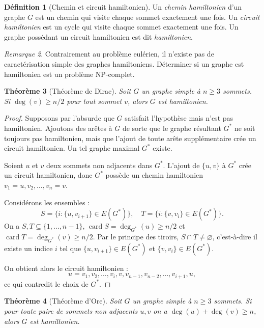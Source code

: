 \documentclass[12pt,a4paper,openany]{book}
\theoremstyle{definition}
\newtheorem{definition}{Définition}[chapter]
\theoremstyle{plain}
\newtheorem{theoreme}[definition]{Théorème}
\theoremstyle{remark}
\newtheorem{remarque}[definition]{Remarque}
\DeclareMathOperator{\card}{card}
\begin{document}
\begin{definition}[Chemin et circuit hamiltonien]
\label{def:hamilton}
Un \emph{chemin hamiltonien} d'un graphe $G$ est un chemin qui visite
chaque sommet exactement une fois. Un \emph{circuit hamiltonien} est un
cycle qui visite chaque sommet exactement une fois. Un graphe possédant
un circuit hamiltonien est dit \emph{hamiltonien}.
\end{definition}

\begin{remarque}
Contrairement au problème eulérien, il n'existe pas de caractérisation
simple des graphes hamiltoniens. Déterminer si un graphe est hamiltonien
est un problème NP-complet.
\end{remarque}

\begin{theoreme}[Théorème de Dirac]
\label{thm:dirac}
Soit $G$ un graphe simple à $n \geq 3$ sommets. Si $\deg(v) \geq n/2$
pour tout sommet $v$, alors $G$ est hamiltonien.
\end{theoreme}

\begin{proof}
Supposons par l'absurde que $G$ satisfait l'hypothèse mais n'est pas
hamiltonien. Ajoutons des arêtes à $G$ de sorte que le graphe résultant
$G^*$ ne soit toujours pas hamiltonien, mais que l'ajout de toute arête
supplémentaire crée un circuit hamiltonien. Un tel graphe maximal $G^*$
existe.

Soient $u$ et $v$ deux sommets non adjacents dans $G^*$. L'ajout de
$\{u,v\}$ à $G^*$ crée un circuit hamiltonien, donc $G^*$ possède un
chemin hamiltonien $v_1 = u, v_2, \dots, v_n = v$.

Considérons les ensembles :
\[
  S = \{i : \{u, v_{i+1}\} \in E(G^*)\}, \quad
  T = \{i : \{v, v_i\} \in E(G^*)\}.
\]
On a $S,T \subseteq \{1,\dots,n-1\}$, $\card{S} = \deg_{G^*}(u) \geq n/2$
et $\card{T} = \deg_{G^*}(v) \geq n/2$. Par le principe des tiroirs,
$S \cap T \neq \varnothing$, c'est-à-dire il existe un indice $i$ tel que
$\{u, v_{i+1}\} \in E(G^*)$ et $\{v, v_i\} \in E(G^*)$.

On obtient alors le circuit hamiltonien :
\[
  u = v_1, v_2, \dots, v_i, v, v_{n-1}, v_{n-2}, \dots, v_{i+1}, u,
\]
ce qui contredit le choix de $G^*$.
\end{proof}

\begin{theoreme}[Théorème d'Ore]
\label{thm:ore}
Soit $G$ un graphe simple à $n \geq 3$ sommets. Si pour toute paire de
sommets non adjacents $u,v$ on a $\deg(u) + \deg(v) \geq n$, alors $G$
est hamiltonien.
\end{theoreme}
\end{document}
